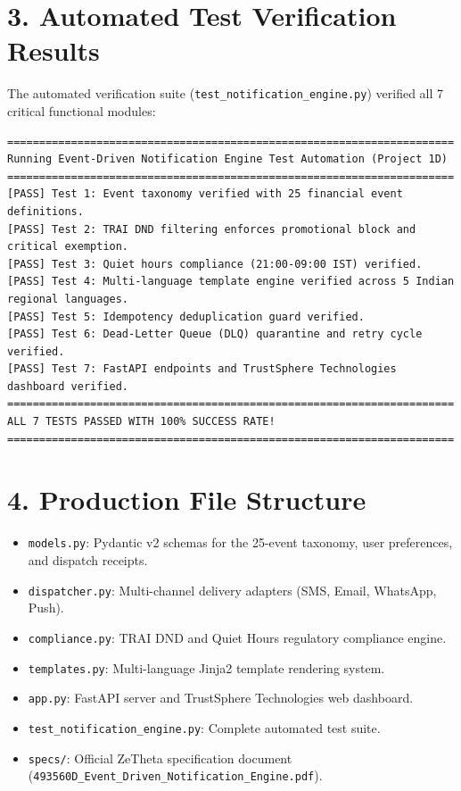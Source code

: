 \documentclass[11pt,a4paper]{article}
\begin{document}
\section{3. Automated Test Verification Results}
The automated verification suite (\texttt{test\_notification\_engine.py}) verified all 7 critical functional modules:
\begin{lstlisting}
======================================================================
Running Event-Driven Notification Engine Test Automation (Project 1D)
======================================================================
[PASS] Test 1: Event taxonomy verified with 25 financial event definitions.
[PASS] Test 2: TRAI DND filtering enforces promotional block and critical exemption.
[PASS] Test 3: Quiet hours compliance (21:00-09:00 IST) verified.
[PASS] Test 4: Multi-language template engine verified across 5 Indian regional languages.
[PASS] Test 5: Idempotency deduplication guard verified.
[PASS] Test 6: Dead-Letter Queue (DLQ) quarantine and retry cycle verified.
[PASS] Test 7: FastAPI endpoints and TrustSphere Technologies dashboard verified.
======================================================================
ALL 7 TESTS PASSED WITH 100% SUCCESS RATE!
======================================================================
\end{lstlisting}

\section{4. Production File Structure}
\begin{itemize}[leftmargin=1.5em, itemsep=2pt]
    \item \texttt{models.py}: Pydantic v2 schemas for the 25-event taxonomy, user preferences, and dispatch receipts.
    \item \texttt{dispatcher.py}: Multi-channel delivery adapters (SMS, Email, WhatsApp, Push).
    \item \texttt{compliance.py}: TRAI DND and Quiet Hours regulatory compliance engine.
    \item \texttt{templates.py}: Multi-language Jinja2 template rendering system.
    \item \texttt{app.py}: FastAPI server and TrustSphere Technologies web dashboard.
    \item \texttt{test\_notification\_engine.py}: Complete automated test suite.
    \item \texttt{specs/}: Official ZeTheta specification document (\texttt{493560D\_Event\_Driven\_Notification\_Engine.pdf}).
\end{itemize}
\end{document}
